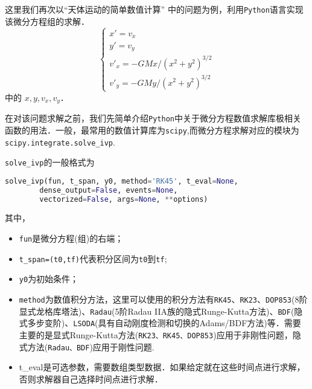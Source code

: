 这里我们再次以“天体运动的简单数值计算” 中的问题为例，利用\verb |Python|语言实现该微分方程组的求解．
\begin{equation}\label{PyIVP_eq}
\begin{cases}
x' = v_x\\
y' = v_y\\
v'_x = -GMx/(x^2 + y^2)^{3/2}\\
v'_y = -GMy/(x^2 + y^2)^{3/2}
\end{cases}
\end{equation}
中的 $x, y, v_x, v_y$．

在对该问题求解之前，我们先简单介绍\verb|Python|中关于微分方程数值求解库极相关函数的用法．一般，最常用的数值计算库为\verb|scipy|,而微分方程求解对应的模块为\verb|scipy.integrate.solve_ivp|.

 \verb|solve_ivp|的一般格式为
 \begin{lstlisting}[language=python]
 solve_ivp(fun, t_span, y0, method='RK45', t_eval=None,
        dense_output=False, events=None, 
        vectorized=False, args=None, **options)
 \end{lstlisting}
 其中，
\begin{itemize}
\item \verb|fun|是微分方程(组)的右端；
\item  \verb|t_span=(t0,tf)|代表积分区间为\verb|t0|到\verb|tf|;
\item  \verb|y0|为初始条件；
\item \verb|method|为数值积分方法，这里可以使用的积分方法有\verb|RK45|、\verb|RK23|、\verb|DOP853|(8阶显式龙格库塔法)、\verb|Radau|(5阶Radau IIA族的隐式Runge-Kutta方法)、\verb|BDF|(隐式多步变阶)、\verb|LSODA|(具有自动刚度检测和切换的Adams/BDF方法)等．需要主要的是显式Runge-Kutta方法(\verb|RK23、RK45、DOP853|)应用于非刚性问题，隐式方法(\verb|Radau、BDF|)应用于刚性问题.
\item t_eval是可选参数，需要数组类型数据．如果给定就在这些时间点进行求解，否则求解器自己选择时间点进行求解．
\end{itemize}